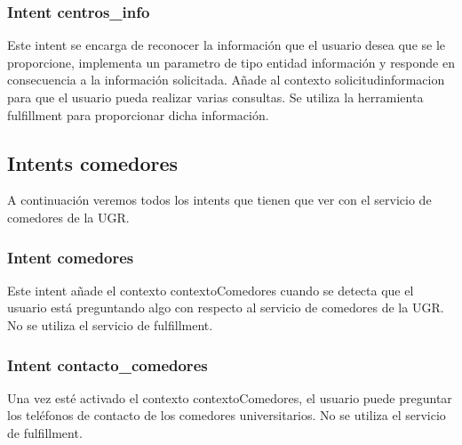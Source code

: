 \vspace{5 mm}
 
\subsubsection{Intent centros_info} 

\vspace{5 mm}

Este intent se encarga de reconocer la información que el usuario desea que se le proporcione, implementa un parametro de tipo entidad información y responde en consecuencia a la información solicitada. Añade al contexto solicitudinformacion para que el usuario pueda realizar varias consultas. Se utiliza la herramienta fulfillment para proporcionar dicha información.

\vspace{5 mm}

\subsection{Intents comedores}

\vspace{5 mm}
 
A continuación veremos todos los intents que tienen que ver con el servicio de comedores de la UGR.

\vspace{5 mm}

\subsubsection{Intent comedores}

\vspace{5 mm}

Este intent añade el contexto contextoComedores cuando se detecta que el usuario está preguntando algo con respecto al servicio de comedores de la UGR. No se utiliza el servicio de fulfillment.

\vspace{5 mm}

\subsubsection{Intent contacto_comedores}

\vspace{5 mm}

Una vez esté activado el contexto contextoComedores, el usuario puede preguntar los teléfonos de contacto de los comedores universitarios. No se utiliza el servicio de fulfillment.

